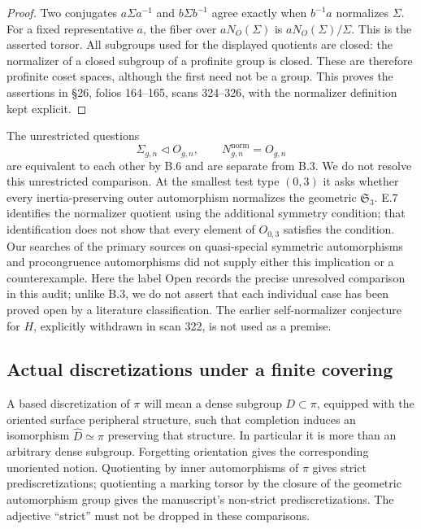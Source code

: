 \begin{proof}
Two conjugates $a\Sigma a^{-1}$ and $b\Sigma b^{-1}$ agree exactly
when $b^{-1}a$ normalizes $\Sigma$.  For a fixed representative $a$,
the fiber over $aN_O(\Sigma)$ is $aN_O(\Sigma)/\Sigma$.
This is the asserted torsor.  All subgroups used for the displayed
quotients are closed: the normalizer of a closed subgroup of a
profinite group is closed.  These are therefore profinite coset spaces,
although the first need not be a group.  This proves the assertions
in \S26, folios 164--165, scans 324--326, with the normalizer definition
kept explicit.
\end{proof}

The unrestricted questions
\[
 \Sigma_{g,n}\triangleleft O_{g,n},\qquad
 N^{\mathrm{norm}}_{g,n}=O_{g,n}
\]
are equivalent to each other by B.6 and are separate from B.3.
We do not resolve this unrestricted comparison.  At the smallest
test type $(0,3)$ it asks whether every inertia-preserving outer
automorphism normalizes the geometric $\mathfrak S_3$.
E.7 identifies the normalizer quotient using the additional
symmetry condition; that identification does not show that every
element of $O_{0,3}$ satisfies the condition.  Our searches of the
primary sources on quasi-special symmetric automorphisms and
procongruence automorphisms did not supply either this implication or
a counterexample.  Here the label Open records the precise unresolved
comparison in this audit; unlike B.3, we do not assert that each
individual case has been proved open by a literature classification.
The earlier self-normalizer conjecture for $H$, explicitly withdrawn
in scan 322, is not used as a premise.

\subsection{Actual discretizations under a finite covering}

A based discretization of $\pi$ will mean a dense subgroup
$D\subset\pi$, equipped with the oriented surface peripheral
structure, such that completion induces an isomorphism
$\widehat D\simeq\pi$ preserving that structure.  In particular it is
more than an arbitrary dense subgroup.  Forgetting orientation gives
the corresponding unoriented notion.  Quotienting by inner
automorphisms of $\pi$ gives strict prediscretizations; quotienting a
marking torsor by the closure of the geometric automorphism group
gives the manuscript's non-strict prediscretizations.  The adjective
``strict'' must not be dropped in these comparisons.


